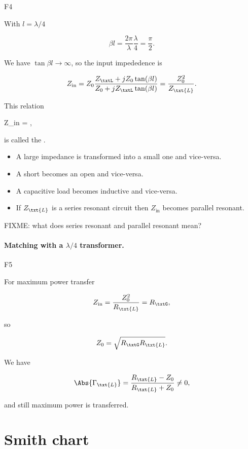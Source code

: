 F4

With \( l = \lambda/4 \)

\begin{dmath}\label{eqn:uwavesDeck5SmithChartCore:220}
\beta l 
= \frac{2 \pi}{\lambda} \frac{\lambda}{4}
= \frac{\pi}{2}.
\end{dmath}

We have \( \tan \beta l \rightarrow \infty \), so the input impededence is

\begin{dmath}\label{eqn:uwavesDeck5SmithChartCore:240}
Z_{\textrm{in}} 
= Z_0 \frac{ Z_\txtL + j Z_0 \tan(\beta l) }{ Z_0 + j Z_\txtL \tan(\beta l)}
= \frac{Z_0^2}{Z_\txt{L}}.
\end{dmath}

This relation

{
Z_{\textrm{in}} 
= ,
}

is called the .

\begin{itemize}
\item A large impedance is transformed into a small one and vice-versa.
\item A short becomes an open and vice-versa.
\item A capacitive load becomes inductive and vice-versa.
\item If \( Z_\txt{L} \) is a series resonant circuit then \( Z_{\textrm{in}} \) becomes parallel resonant.
\end{itemize}

FIXME: what does series resonant and parallel resonant mean?

\paragraph{Matching with a \( \lambda/4 \) transformer.}

F5

For maximum power transfer

\begin{equation}\label{eqn:uwavesDeck5SmithChartCore:300}
Z_{\textrm{in}} = \frac{Z_0^2}{R_\txt{L}} = R_\txtG, 
\end{equation}

so

\begin{equation}\label{eqn:uwavesDeck5SmithChartCore:320}
Z_0 = \sqrt{ R_\txtG R_\txt{L} }.
\end{equation}

We have

\begin{equation}\label{eqn:uwavesDeck5SmithChartCore:340}
\Abs{\Gamma_\txt{L}} = \frac{ R_\txt{L} - Z_0 }{R_\txt{L} + Z_0} \ne 0,
\end{equation}

and still maximum power is transferred.

\section{Smith chart}
